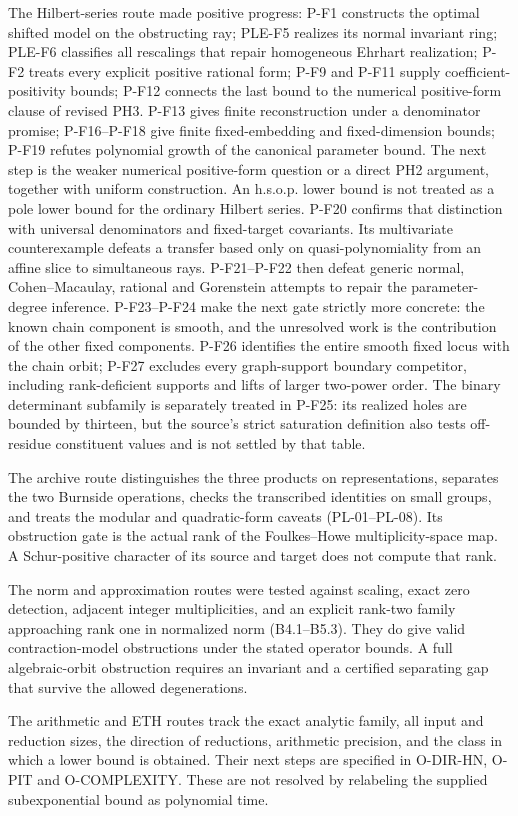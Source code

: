The Hilbert-series route made positive progress: P-F1 constructs the
optimal shifted model on the obstructing ray; PLE-F5 realizes its normal
invariant ring; PLE-F6 classifies all rescalings that repair homogeneous
Ehrhart realization; P-F2 treats every explicit positive rational form;
P-F9 and P-F11 supply coefficient-positivity bounds; P-F12 connects the
last bound to the numerical positive-form clause of revised PH3.
P-F13 gives finite reconstruction under a denominator promise;
P-F16--P-F18 give finite fixed-embedding and fixed-dimension bounds;
P-F19 refutes polynomial growth of the canonical parameter bound.
The next step is the weaker numerical positive-form question or a
direct PH2 argument, together with uniform construction. An h.s.o.p.
lower bound is not treated as a pole lower bound for the ordinary
Hilbert series.
P-F20 confirms that distinction with universal denominators and
fixed-target covariants. Its multivariate counterexample defeats a
transfer based only on quasi-polynomiality from an affine slice to
simultaneous rays. P-F21--P-F22 then defeat generic normal,
Cohen--Macaulay, rational and Gorenstein attempts to repair the
parameter-degree inference. P-F23--P-F24 make the next gate
strictly more concrete: the known chain component is smooth, and
the unresolved work is the contribution of the other fixed
components. P-F26 identifies the entire smooth fixed locus with
the chain orbit; P-F27 excludes every graph-support boundary
competitor, including rank-deficient supports and lifts of larger
two-power order. The binary determinant subfamily is separately treated
in P-F25: its realized holes are bounded by thirteen, but the
source's strict saturation definition also tests off-residue
constituent values and is not settled by that table.

The archive route distinguishes the three products on representations,
separates the two Burnside operations, checks the transcribed identities
on small groups, and treats the modular and quadratic-form caveats
(PL-01--PL-08). Its obstruction gate is the actual rank of the
Foulkes--Howe multiplicity-space map. A Schur-positive character of its
source and target does not compute that rank.

The norm and approximation routes were tested against scaling, exact
zero detection, adjacent integer multiplicities, and an explicit rank-two
family approaching rank one in normalized norm (B4.1--B5.3). They do give
valid contraction-model obstructions under the stated operator bounds.
A full algebraic-orbit obstruction requires an invariant and a certified
separating gap that survive the allowed degenerations.

The arithmetic and ETH routes track the exact analytic family, all input
and reduction sizes, the direction of reductions, arithmetic precision,
and the class in which a lower bound is obtained. Their next steps are
specified in O-DIR-HN, O-PIT and O-COMPLEXITY. These are not resolved by
relabeling the supplied subexponential bound as polynomial time.
